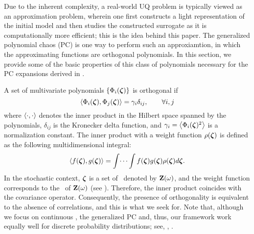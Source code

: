 
Due to the inherent complexity, a real-world UQ problem is typically viewed as an approximation problem, wherein one first constructs a light representation of the initial model and then studies the constructed surrogate as it is computationally more efficient; this is the idea behind this paper. The generalized polynomial chaos (PC) \cite{xiu2002} is one way to perform such an approxiamtion, in which the approximating functions are orthogonal polynomials. In this section, we provide some of the basic properties \cite{xiu2010, maitre2010} of this class of polynomials necessary for the PC expansions derived in .

A set of multivariate polynomials $\{ \Phi_i(\boldsymbol{\zeta}) \}$ is orthogonal if
\begin{equation} \elabel{orthogonality}
  \oInner{\pcb_i(\vz)}{\pcb_j(\vz)} = \pcn_i \delta_{ij}, \qquad \forall i, j
\end{equation}
where $\oInner{\idot}{\idot}$ denotes the inner product in the Hilbert space spanned by the polynomials, $\delta_{ij}$ is the Kronecker delta function, and $\pcn_i = \oInner{\pcb_i(\vz)^2}$ is a normalization constant. The inner product with a weight function $\rho(\boldsymbol{\zeta})$ is defined as the following multidimensional integral:
\begin{equation} \elabel{inner-product}
  \oInner{f(\vz)}{g(\vz)} = \int \dotsi \int f(\vz) g(\vz) \PDF(\vz) d\vz.
\end{equation}
In the stochastic context, $\boldsymbol{\zeta}$ is a set of \rvs\ denoted by $\mathbf{Z}(\omega)$, and the weight function corresponds to the \pdf\ of $\mathbf{Z}(\omega)$ (see ). Therefore, the inner product coincides with the covariance operator. Consequently, the presence of orthogonality is equivalent to the absence of correlations, and this is what we seek for. Note that, although we focus on continuous \rvs, the generalized PC and, thus, our framework work equally well for discrete probability distributions; see, \eg, \cite{xiu2010, maitre2010, xiu2002}.


